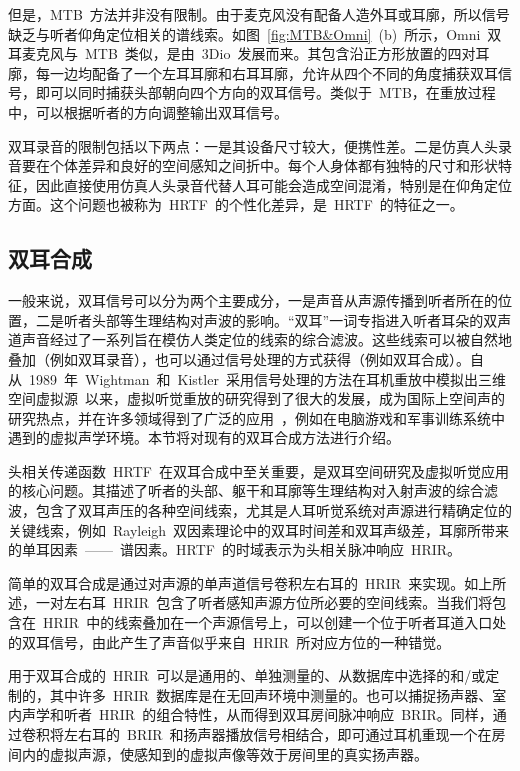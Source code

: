 但是，MTB~方法并非没有限制。由于麦克风没有配备人造外耳或耳廓，所以信号缺乏与听者仰角定位相关的谱线索。如图~\ref{fig:MTB&Omni}~(b)~所示，Omni~双耳麦克风与~MTB~类似，是由~3Dio~发展而来。其包含沿正方形放置的四对耳廓，每一边均配备了一个左耳耳廓和右耳耳廓，允许从四个不同的角度捕获双耳信号，即可以同时捕获头部朝向四个方向的双耳信号。类似于~MTB，在重放过程中，可以根据听者的方向调整输出双耳信号。


双耳录音的限制包括以下两点：一是其设备尺寸较大，便携性差。二是仿真人头录音要在个体差异和良好的空间感知之间折中。每个人身体都有独特的尺寸和形状特征，因此直接使用仿真人头录音代替人耳可能会造成空间混淆，特别是在仰角定位方面。这个问题也被称为~HRTF~的个性化差异，是~HRTF~的特征之一。


\subsection{双耳合成}

一般来说，双耳信号可以分为两个主要成分，一是声音从声源传播到听者所在的位置，二是听者头部等生理结构对声波的影响。“双耳”一词专指进入听者耳朵的双声道声音经过了一系列旨在模仿人类定位的线索的综合滤波。这些线索可以被自然地叠加（例如双耳录音），也可以通过信号处理的方式获得（例如双耳合成）。自从~1989~年~Wightman~和~Kistler~采用信号处理的方法在耳机重放中模拟出三维空间虚拟源~以来，虚拟听觉重放的研究得到了很大的发展，成为国际上空间声的研究热点，并在许多领域得到了广泛的应用~，例如在电脑游戏和军事训练系统中遇到的虚拟声学环境。本节将对现有的双耳合成方法进行介绍。

头相关传递函数~HRTF~在双耳合成中至关重要，是双耳空间研究及虚拟听觉应用的核心问题。其描述了听者的头部、躯干和耳廓等生理结构对入射声波的综合滤波，包含了双耳声压的各种空间线索，尤其是人耳听觉系统对声源进行精确定位的关键线索，例如~Rayleigh~双因素理论中的双耳时间差和双耳声级差，耳廓所带来的单耳因素~——~谱因素。HRTF~的时域表示为头相关脉冲响应~HRIR。

简单的双耳合成是通过对声源的单声道信号卷积左右耳的~HRIR~来实现。如上所述，一对左右耳~HRIR~包含了听者感知声源方位所必要的空间线索。当我们将包含在~HRIR~中的线索叠加在一个声源信号上，可以创建一个位于听者耳道入口处的双耳信号，由此产生了声音似乎来自~HRIR~所对应方位的一种错觉。

用于双耳合成的~HRIR~可以是通用的、单独测量的、从数据库中选择的和/或定制的，其中许多~HRIR~数据库是在无回声环境中测量的。也可以捕捉扬声器、室内声学和听者~HRIR~的组合特性，从而得到双耳房间脉冲响应~BRIR。同样，通过卷积将左右耳的~BRIR~和扬声器播放信号相结合，即可通过耳机重现一个在房间内的虚拟声源，使感知到的虚拟声像等效于房间里的真实扬声器。

